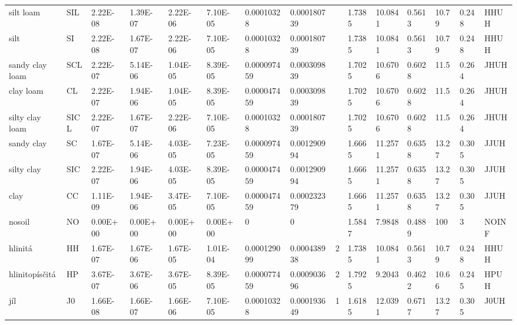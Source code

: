 \begin{sidewaystable}
{\begin{tabular}{lllllllllllllll}
silt loam       & SIL      & 2.22E-08    & 1.39E-07  & 2.22E-06 & 7.10E-05    & 0.00010328    & 0.000180739 &       & 1.7385 & 10.0841 & 0.5613 & 10.79 & 0.248 & HHUH          \\
silt            & SI       & 2.22E-08    & 1.67E-07  & 2.22E-06 & 7.10E-05    & 0.00010328    & 0.000180739 &       & 1.7385 & 10.0841 & 0.5613 & 10.79 & 0.248 & HHUH          \\
sandy clay loam & SCL      & 2.22E-07    & 5.14E-06  & 1.04E-05 & 8.39E-05    & 0.000097459   & 0.000309839 &       & 1.7025 & 10.6706 & 0.6028 & 11.5  & 0.264 & JHUH          \\
clay loam       & CL       & 2.22E-07    & 1.94E-06  & 1.04E-05 & 8.39E-05    & 0.000047459   & 0.000309839 &       & 1.7025 & 10.6706 & 0.6028 & 11.5  & 0.264 & JHUH          \\
silty clay loam & SICL     & 2.22E-07    & 1.67E-07  & 2.22E-06 & 7.10E-05    & 0.00010328    & 0.000180739 &       & 1.7025 & 10.6706 & 0.6028 & 11.5  & 0.264 & JHUH          \\
sandy clay      & SC       & 1.67E-07    & 5.14E-06  & 4.03E-05 & 7.23E-05    & 0.000097459   & 0.001290994 &       & 1.6665 & 11.2571 & 0.6358 & 13.27 & 0.305 & JJUH          \\
silty clay      & SIC      & 2.22E-07    & 1.94E-06  & 4.03E-05 & 8.39E-05    & 0.000047459   & 0.001290994 &       & 1.6665 & 11.2571 & 0.6358 & 13.27 & 0.305 & JJUH          \\
clay            & CC       & 1.11E-09    & 1.94E-06  & 3.47E-05 & 7.10E-05    & 0.000047459   & 0.000232379 &       & 1.6665 & 11.2571 & 0.6358 & 13.27 & 0.305 & JJUH          \\
nosoil          & NO       & 0.00E+00    & 0.00E+00  & 0.00E+00 & 0.00E+00    & 0             & 0           &       & 1.5847 & 7.9848  & 0.4889 & 100   & 3     & NOINF         \\
hlinitá         & HH       & 1.67E-07    & 1.67E-06  & 1.67E-05 & 1.01E-04    & 0.000129099   & 0.000438938 & 2     & 1.7385 & 10.0841 & 0.5613 & 10.79 & 0.248 & HHUH          \\
hlinitopísčitá  & HP       & 3.67E-07    & 3.67E-06  & 3.67E-05 & 8.39E-05    & 0.000077459   & 0.000903696 & 2     & 1.7925 & 9.2043  & 0.4622 & 10.66 & 0.245 & HPUH          \\
jíl             & J0       & 1.66E-08    & 1.66E-07  & 1.66E-06 & 7.10E-05    & 0.00010328    & 0.000193649 & 1     & 1.6185 & 12.0391 & 0.6717 & 13.27 & 0.305 & J0UH          \\

\end{tabular}}
\end{sidewaystable}

